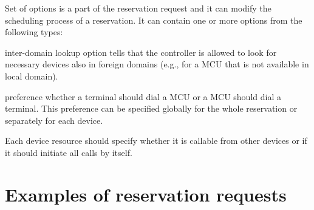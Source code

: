 Set of options is a part of the reservation request and it can modify the scheduling process of a reservation. It can contain one or more options from the following types:
\begin{compactitem}
\item inter-domain lookup option tells that the controller is allowed to look for necessary devices also in foreign domains (e.g., for a MCU that is not available in local domain).
\item preference whether a terminal should dial a MCU or a MCU should dial a terminal. This preference can be specified globally for the whole reservation or separately for each device.
\end{compactitem}
Each device resource should specify whether it is callable from other devices or if it should initiate all calls by itself.


\section{Examples of reservation requests}

\CodeStyle{}
\CodeStyleAppendImplementation
\CodeStyleAppendEnum

